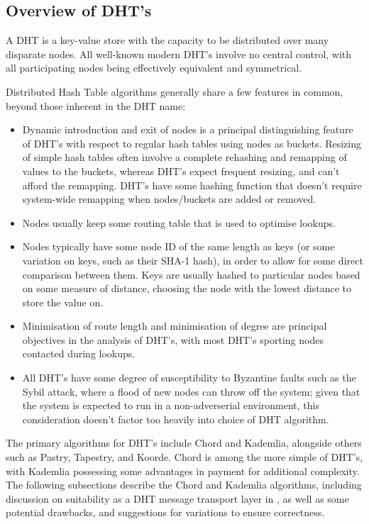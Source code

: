\subsection{Overview of DHT's}

A DHT is a key-value store with the capacity to be distributed over many disparate nodes\cite{balakrishnan2003p2p}.
All well-known modern DHT's involve no central control, with all participating nodes being effectively equivalent and symmetrical.

Distributed Hash Table algorithms generally share a few features in common, beyond those inherent in the DHT name:
\begin{itemize}
	\item Dynamic introduction and exit of nodes is a principal distinguishing feature of DHT's with respect to regular hash tables using nodes as buckets.
		Resizing of simple hash tables often involve a complete rehashing and remapping of values to the buckets, whereas DHT's expect frequent resizing, and can't afford the remapping.
		DHT's have some hashing function that doesn't require system-wide remapping when nodes/buckets are added or removed\cite{thaler1996rendezvous}.
	\item Nodes usually keep some routing table that is used to optimise lookups\cite{galuba2009p2p}.
	\item Nodes typically have some node ID of the same length as keys (or some variation on keys, such as their SHA-1 hash), in order to allow for some direct comparison between them. Keys are usually hashed to particular nodes based on some measure of distance, choosing the node with the lowest distance to store the value on.
	\item Minimisation of route length and minimisation of degree are principal objectives in the analysis of DHT's, with most DHT's sporting  nodes contacted during lookups.
	\item All DHT's have some degree of susceptibility to Byzantine faults such as the Sybil attack, where a flood of new nodes can throw off the system; given that the \lsr{} system is expected to run in a non-adverserial environment, this consideration doesn't factor too heavily into choice of DHT algorithm\cite{douceur2002sybil}\cite{urdaneta2011dhtsec}.
\end{itemize}

The primary algorithms for DHT's include Chord and Kademlia, alongside others such as Pastry, Tapestry, and Koorde.
Chord is among the more simple of DHT's, with Kademlia possessing some advantages in payment for additional complexity.
The following subsections describe the Chord and Kademlia algorithms, including discussion on suitability as a DHT message transport layer in \lsr{}, as well as some potential drawbacks, and suggestions for variations to ensure correctness.

